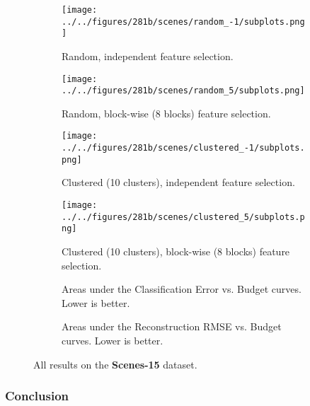 \begin{figure}[ht]
    \centering
    \begin{subfigure}[b]{.8\textwidth}
        \centering
        \texttt{[image: ../../figures/281b/scenes/random\_-1/subplots.png]}
        \caption{Random, independent feature selection.\vspace{.2cm}}
    \end{subfigure}
    \begin{subfigure}[b]{.8\textwidth}
        \centering
        \texttt{[image: ../../figures/281b/scenes/random\_5/subplots.png]}
        \caption{Random, block-wise (8 blocks) feature selection.\vspace{.2cm}}
    \end{subfigure}
    \begin{subfigure}[b]{\textwidth}
        \centering
        \texttt{[image: ../../figures/281b/scenes/clustered\_-1/subplots.png]}
        \caption{Clustered (10 clusters), independent feature selection.\vspace{.2cm}}
    \end{subfigure}
    \begin{subfigure}[b]{\textwidth}
        \centering
        \texttt{[image: ../../figures/281b/scenes/clustered\_5/subplots.png]}
        \caption{Clustered (10 clusters), block-wise (8 blocks) feature selection.\vspace{.2cm}}
    \end{subfigure}

    \begin{subfigure}[b]{1\textwidth}
        \centering
        \tiny{}
        \caption{Areas under the Classification Error vs. Budget curves. Lower is better.}
    \end{subfigure}
    \begin{subfigure}[b]{1\textwidth}
        \centering
        \tiny{}
        \caption{Areas under the Reconstruction RMSE vs. Budget curves. Lower is better.}
    \end{subfigure}
    \caption{All results on the \textbf{Scenes-15} dataset.}
    \label{fig:scenes}
\end{figure}

\subsubsection{Conclusion}

